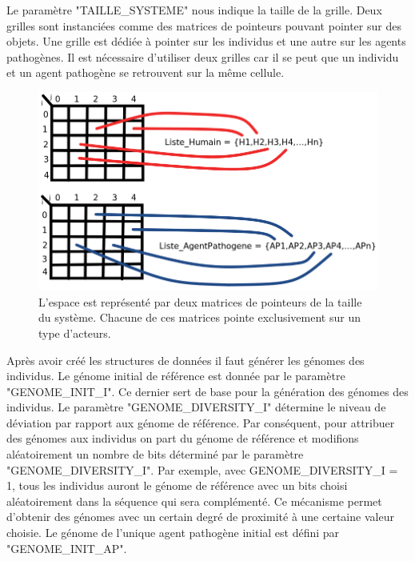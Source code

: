 Le paramètre {\small "TAILLE\_SYSTEME"} nous indique la taille de la grille. Deux grilles sont instanciées comme des matrices de pointeurs pouvant pointer sur des objets. Une grille est dédiée à pointer sur les individus et une autre sur les agents pathogènes. Il est nécessaire d'utiliser deux grilles car il se peut que un individu et un agent pathogène se retrouvent sur la même cellule.\\

\begin{figure}[h]
\centering
\captionsetup{justification=centering}
\includegraphics[scale=0.4]{Images/MatricesPointeurs.png}
\caption[Matrices de pointeurs]{L'espace est représenté par deux matrices de pointeurs de la taille du système. Chacune de ces matrices pointe exclusivement sur un type d'acteurs.}
\end{figure}

Après avoir créé les structures de données il faut générer les génomes des individus. Le génome initial de référence est donnée par le paramètre {\small "GENOME\_INIT\_I"}. Ce dernier sert de base pour la génération des génomes des individus. Le paramètre {\small "GENOME\_DIVERSITY\_I"} détermine le niveau de déviation par rapport aux génome de référence. Par conséquent, pour attribuer des génomes aux individus on part du génome de référence et modifions aléatoirement un nombre de bits déterminé par le paramètre {\small "GENOME\_DIVERSITY\_I"}. Par exemple, avec {\small GENOME\_DIVERSITY\_I} = 1, tous les individus auront le génome de référence avec un bits choisi aléatoirement dans la séquence qui sera complémenté. Ce mécanisme permet d'obtenir des génomes avec un certain degré de proximité à une certaine valeur choisie. Le génome de l'unique agent pathogène initial est défini par {\small "GENOME\_INIT\_AP"}.\\

